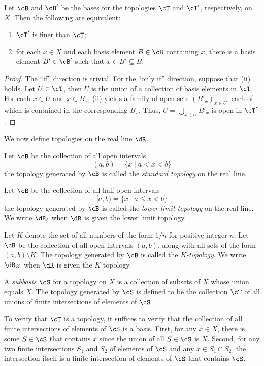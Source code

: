 \documentclass{amsart}
\begin{document}
\begin{lem}
  Let $\cB$ and $\cB'$ be the bases for the topologies $\cT$ and $\cT'$, respectively, on $X$.
  Then the following are equivalent:
  \begin{enumerate}
  \item $\cT'$ is finer than $\cT$;
  \item for each $x \in X$ and each basis element $B \in \cB$ containing $x$, there is a basis element $B' \in \cB'$ such that $x \in B' \subseteq B$.
  \end{enumerate}
\end{lem}
\begin{proof}
  The ``if'' direction is trivial.
  For the ``only if'' direction, suppose that (ii) holds.
  Let $U \in \cT$, then $U$ is the union of a collection of basis elements in $\cT$.
  For each $x \in U$ and $x \in B_{x}$, (ii) yields a family of open sets $(B'_{x})_{x \in U}$, each of which is contained in the corresponding $B_{x}$.
  Thus, $U = \bigcup_{x \in U}B'_{x}$ is open in $\cT'$.
\end{proof}

We now define topologies on the real line $\dR$.

\begin{defn}
  Let $\cB$ be the collection of all open intervals
  \[
    (a,b) = \{x \mid a < x < b\}
  \]
  the topology generated by $\cB$ is called the \emph{standard topology} on the real line.
\end{defn}

\begin{defn}
  Let $\cB$ be the collection of all half-open intervals
  \[
    [a,b) = \{x \mid a \leq x < b\}
  \]
  the topology generated by $\cB$ is called the \emph{lower limit topology} on the real line.
  We write $\dR_{\ell}$ when $\dR$ is given the lower limit topology.
\end{defn}

\begin{defn}
  Let $K$ denote the set of all numbers of the form $1/n$ for positive integer $n$.
  Let $\cB$ be the collection of all open intervals $(a,b)$, along with all sets of the form $(a,b) \setminus K$.
  The topology generated by $\cB$ is called the \emph{$K$-topology}.
  We write $\dR_{K}$ when $\dR$ is given the $K$ topology.
\end{defn}

\begin{defn}
  A \emph{subbasis} $\cS$ for a topology on $X$ is a collection of subsets of $X$ whose union equals $X$.
  The topology generated by $\cS$ is defined to be the collection $\cT$ of all unions of finite intersections of elements of $\cS$.
\end{defn}
To verify that $\cT$ is a topology, it suffices to verify that the collection of all finite intersections of elements of $\cS$ is a basis.
First, for any $x \in X$, there is some $S \in \cS$ that contains $x$ since the union of all $S \in \cS$ is $X$.
Second, for any two finite intersections $S_{1}$ and $S_{2}$ of elements of $\cS$ and any $x \in S_{1} \cap S_{2}$, the intersection itself is a finite intersection of elements of $\cS$ that contains $\cS$.
\end{document}
